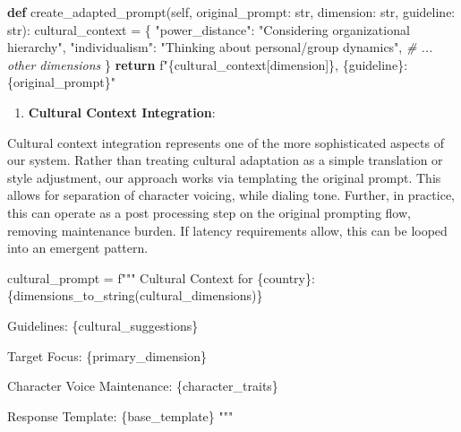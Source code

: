 \documentclass[
]{article}
\newenvironment{Shaded}{}{}
\newcommand{\BuiltInTok}[1]{\textcolor[rgb]{0.00,0.50,0.00}{#1}}
\newcommand{\CommentTok}[1]{\textcolor[rgb]{0.38,0.63,0.69}{\textit{#1}}}
\newcommand{\ControlFlowTok}[1]{\textcolor[rgb]{0.00,0.44,0.13}{\textbf{#1}}}
\newcommand{\KeywordTok}[1]{\textcolor[rgb]{0.00,0.44,0.13}{\textbf{#1}}}
\newcommand{\NormalTok}[1]{#1}
\newcommand{\OperatorTok}[1]{\textcolor[rgb]{0.40,0.40,0.40}{#1}}
\newcommand{\SpecialCharTok}[1]{\textcolor[rgb]{0.25,0.44,0.63}{#1}}
\newcommand{\SpecialStringTok}[1]{\textcolor[rgb]{0.73,0.40,0.53}{#1}}
\newcommand{\StringTok}[1]{\textcolor[rgb]{0.25,0.44,0.63}{#1}}
\newcommand{\VariableTok}[1]{\textcolor[rgb]{0.10,0.09,0.49}{#1}}
\providecommand{\tightlist}{%
  \setlength{\itemsep}{0pt}\setlength{\parskip}{0pt}}
\begin{document}
\begin{Shaded}
\begin{Highlighting}[]
\KeywordTok{def}\NormalTok{ create\_adapted\_prompt(}\VariableTok{self}\NormalTok{, original\_prompt: }\BuiltInTok{str}\NormalTok{, dimension: }\BuiltInTok{str}\NormalTok{, guideline: }\BuiltInTok{str}\NormalTok{)}\NormalTok{:}
\NormalTok{    cultural\_context }\OperatorTok{=}\NormalTok{ \{}
        \StringTok{"power\_distance"}\NormalTok{: }\StringTok{"Considering organizational hierarchy"}\NormalTok{,}
        \StringTok{"individualism"}\NormalTok{: }\StringTok{"Thinking about personal/group dynamics"}\NormalTok{,}
        \CommentTok{\# ... other dimensions}
\NormalTok{    \}}
    \ControlFlowTok{return} \SpecialStringTok{f"}\SpecialCharTok{\{}\NormalTok{cultural\_context[dimension]}\SpecialCharTok{\}}\SpecialStringTok{, }\SpecialCharTok{\{}\NormalTok{guideline}\SpecialCharTok{\}}\SpecialStringTok{: }\SpecialCharTok{\{}\NormalTok{original\_prompt}\SpecialCharTok{\}}\SpecialStringTok{"}
\end{Highlighting}
\end{Shaded}

\begin{enumerate}
\def\labelenumi{\arabic{enumi}.}
\setcounter{enumi}{1}
\tightlist
\item
  \textbf{Cultural Context Integration}:
\end{enumerate}

Cultural context integration represents one of the more sophisticated aspects of our system. Rather than treating cultural adaptation as a simple translation or style adjustment, our approach works via templating the original prompt. This allows for separation of character voicing, while dialing tone. Further, in practice, this can operate as a post processing step on the original prompting flow, removing maintenance burden. If latency requirements allow, this can be looped into an emergent pattern.

\begin{Shaded}
\begin{Highlighting}[]
\NormalTok{cultural\_prompt }\OperatorTok{=} \StringTok{f"""}
\StringTok{Cultural Context for }\SpecialCharTok{\{}\NormalTok{country}\SpecialCharTok{\}}\StringTok{:}
\SpecialCharTok{\{}\NormalTok{dimensions\_to\_string(cultural\_dimensions)}\SpecialCharTok{\}}

\StringTok{Guidelines:}
\SpecialCharTok{\{}\NormalTok{cultural\_suggestions}\SpecialCharTok{\}}

\StringTok{Target Focus: }\SpecialCharTok{\{}\NormalTok{primary\_dimension}\SpecialCharTok{\}}

\StringTok{Character Voice Maintenance:}
\SpecialCharTok{\{}\NormalTok{character\_traits}\SpecialCharTok{\}}

\StringTok{Response Template:}
\SpecialCharTok{\{}\NormalTok{base\_template}\SpecialCharTok{\}}
\StringTok{"""}
\end{Highlighting}
\end{Shaded}
\end{document}
